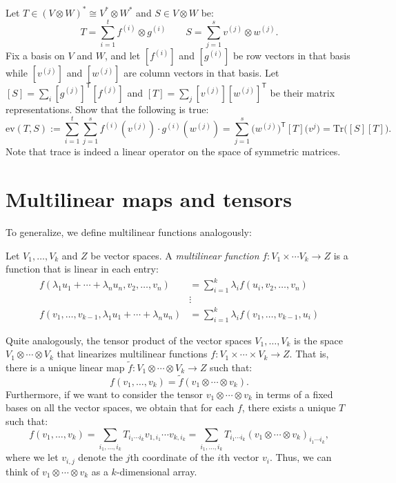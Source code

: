 \begin{exercise}
  Let $T \in (V \otimes W)^* \cong V^* \otimes W^*$ and $S \in V
  \otimes W$ be: 
  \[T = \sum_{i=1}^t f^{(i)} \otimes g^{(i)} \quad \quad S =
  \sum_{j=1}^s v^{(j)} \otimes w^{(j)}.\] 
  Fix a basis on $V$ and $W$, and let $[f^{(i)}]$ and $[g^{(i)}]$ be
  row vectors in that basis while $[v^{(j)}]$ and $[w^{(j)}]$ are
  column vectors in that basis. Let $[S] = \sum_i
  [g^{(j)}]^{\mathsf{T}} [f^{(j)}]$ and $[T] = \sum_j
  [v^{(j)}][w^{(j)}]^\mathsf{T}$ be their matrix representations. Show
  that the following is true: 
  \[\mathrm{ev}(T,S) := \sum_{i=1}^t \sum_{j=1}^s f^{(i)}(v^{(j)})
  \cdot g^{(i)}(w^{(j)}) = \sum_{j=1}^s
  \big(w^{(j)}\big)^{\mathsf{T}}[T]\big(v^{j}\big) =
  \mathrm{Tr}\big([S][T]\big).\] 
  Note that trace is indeed a linear operator on the space of
  symmetric matrices. 
\end{exercise}



\section{Multilinear maps and tensors}
To generalize, we define multilinear functions analogously: 
\begin{definition}
  Let $V_1,\dotsc, V_k$ and $Z$ be vector spaces. A \emph{multilinear
    function} $f : V_1\times \dotsm V_k \to Z$ is a function that is
  linear in each entry: 
    \begin{align*}
      f(\lambda_1u_1 + \dotsm + \lambda_n u_n, v_2,\dotsc, v_n) &=
      \sum_{i=1}^k \lambda_i f(u_i,v_2,\dotsc, v_n)\\ 
      &\vdots \\
      f(v_1, \dotsc,v_{k-1},\lambda_1u_1 + \dotsm + \lambda_n u_n) &=
      \sum_{i=1}^k \lambda_i f(v_1,\dotsc,v_{k-1}, u_i) 
    \end{align*}
\end{definition}
Quite analogously, the tensor product of the vector spaces
$V_1,\dotsc, V_k$ is the space $V_1 \otimes \dotsm \otimes V_k$ that
linearizes multilinear functions $f : V_1 \times \dotsm \times V_k \to
Z$. That is, there is a unique linear map $\tilde{f}: V_1 \otimes
\dotsm \otimes V_k \to Z$ such that: 
\[f(v_1,\dotsc, v_k) = \tilde{f}(v_1 \otimes \dotsm \otimes v_k).\]
Furthermore, if we want to consider the tensor $v_1 \otimes \dotsm
\otimes v_k$ in terms of a fixed bases on all the vector spaces, we
obtain that for each $f$, there exists a unique $T$ such that: 
\[f(v_1,\dotsc, v_k) = \sum_{i_1,\dotsc, i_k} T_{i_1\dotsm i_k}
v_{1,i_1} \dotsm v_{k,i_k} = \sum_{i_1,\dotsc, i_k} T_{i_1\dotsm i_k}
(v_1\otimes \dotsm \otimes v_k)_{i_1\dotsm i_k},\] 
where we let $v_{i,j}$ denote the $j$th coordinate of the $i$th vector
$v_i$. Thus, we can think of $v_1 \otimes \dotsm \otimes v_k$ as a
$k$-dimensional array. 




